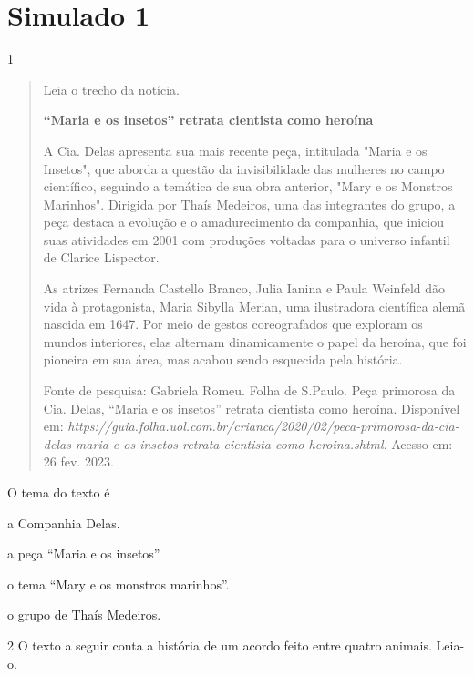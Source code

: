 \chapter{Simulado 1}

\num{1}

\begin{quote}
Leia o trecho da notícia.

\textbf{``Maria e os insetos'' retrata cientista como heroína}

A Cia. Delas apresenta sua mais recente peça, intitulada "Maria e os Insetos", que aborda a questão da invisibilidade das mulheres no campo científico, seguindo a temática de sua obra anterior, "Mary e os Monstros Marinhos". Dirigida por Thaís Medeiros, uma das integrantes do grupo, a peça destaca a evolução e o amadurecimento da companhia, que iniciou suas atividades em 2001 com produções voltadas para o universo infantil de Clarice Lispector.

As atrizes Fernanda Castello Branco, Julia Ianina e Paula Weinfeld dão vida à protagonista, Maria Sibylla Merian, uma ilustradora científica alemã nascida em 1647. Por meio de gestos coreografados que exploram os mundos interiores, elas alternam dinamicamente o papel da heroína, que foi pioneira em sua área, mas acabou sendo esquecida pela história.

Fonte de pesquisa: Gabriela Romeu. Folha de S.Paulo. Peça primorosa da Cia. Delas, ``Maria e os insetos'' retrata cientista como heroína. Disponível em:
\emph{https://guia.folha.uol.com.br/crianca/2020/02/peca-primorosa-da-cia-delas-maria-e-os-insetos-retrata-cientista-como-heroina.shtml}.
Acesso em: 26 fev. 2023.
\end{quote}

O tema do texto é

\begin{escolha}
\item a Companhia Delas.

\item a peça ``Maria e os insetos''.

\item o tema ``Mary e os monstros marinhos''.

\item o grupo de Thaís Medeiros.
\end{escolha}

\num{2} O texto a seguir conta a história de um acordo feito entre quatro
animais. Leia-o.

